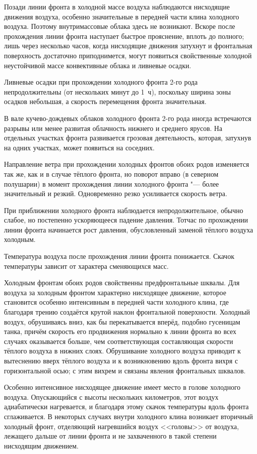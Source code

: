 \documentclass[a4paper, 12pt, twoside, final, book, russian, fittopage, cyremdash, openright]{ncc}
\begin{document}
Позади линии фронта в холодной массе воздуха наблюдаются нисходящие
движения воздуха, особенно значительные в передней части клина
холодного воздуха. Поэтому внутримассовые облака здесь не
возникают. Вскоре после прохождения линии фронта наступает быстрое
прояснение, вплоть до полного; лишь через несколько часов, когда
нисходящие движения затухнут и фронтальная поверхность достаточно
приподнимется, могут появиться свойственные холодной неустойчивой
массе конвективные облака и ливневые осадки.

Ливневые осадки при прохождении холодного фронта 2-го рода
непродолжительны (от нескольких минут до 1~ч), поскольку ширина зоны
осадков небольшая, а скорость перемещения фронта значительная.

В вале кучево-дождевых облаков холодного фронта 2-го рода иногда
встречаются разрывы или менее развитая облачность нижнего и среднего
ярусов. На отдельных участках фронта развивается грозовая
деятельность, которая, затухнув на одних участках, может появиться на
соседних.

Направление ветра при прохождении холодных фронтов обоих родов
изменяется так же, как и в случае тёплого фронта, но поворот вправо
(в северном полушарии) в момент прохождения линии холодного фронта "---
более значительный и резкий. Одновременно резко усиливается скорость
ветра.

При приближении холодного фронта наблюдается непродолжительное,
обычно слабое, но постепенно ускоряющееся падение давления. Тотчас по
прохождении линии фронта начинается рост давления, обусловленный
заменой тёплого воздуха холодным.

Температура воздуха после прохождения линии фронта понижается. Скачок
температуры зависит от характера сменяющихся масс.

Холодным фронтам обоих родов свойственны предфронтальные шквалы. Для
воздуха за холодным фронтом характерно нисходящее движение, которое
становится особенно интенсивным в передней части холодного клина, где
благодаря трению создаётся крутой наклон фронтальной
поверхности. Холодный воздух, обрушиваясь вниз, как бы перекатывается
вперёд, подобно гусеницам танка, причём скорость его продвижения
нормально к линии фронта во всех случаях оказывается больше, чем
соответствующая составляющая скорости тёплого воздуха в нижних
слоях. Обрушивание холодного воздуха приводит к вытеснению вверх
тёплого воздуха и к возникновению вдоль фронта вихря с горизонтальной
осью; с этим вихрем и связаны явления фронтальных шквалов.

Особенно интенсивное нисходящее движение имеет место в голове
холодного воздуха. Опускающийся с высоты нескольких километров, этот
воздух адиабатически нагревается, и благодаря этому скачок температуры
вдоль фронта сглаживается. В некоторых случаях внутри холодного клина
возникает вторичный холодный фронт, отделяющий нагревшийся воздух
<<головы>> от воздуха, лежащего дальше от линии фронта и не
захваченного в такой степени нисходящим движением.
\end{document}
